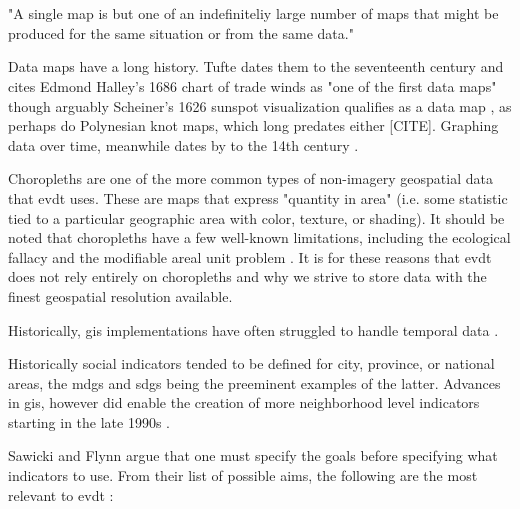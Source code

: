 \chapter{} \label{ch:method}



\section{}


"A single map is but one of an indefiniteliy large number of maps that might be produced for the same situation or from the same data." \cite{monmonierHowLieMaps1996}

Data maps have a long history. Tufte dates them to the seventeenth century and cites Edmond Halley's 1686 chart of trade winds as "one of the first data maps" \cite{tufteVisualDisplayQuantitative2001} though arguably Scheiner's 1626 sunspot visualization qualifies as a data map \cite{friendlyBriefHistoryData2008}, as perhaps do Polynesian knot maps, which long predates either [CITE]. Graphing data over time, meanwhile dates by to the 14th century \cite{friendlyBriefHistoryData2008}.

Choropleths are one of the more common types of non-imagery geospatial data that \ac{evdt} uses. These are maps that express "quantity in area" (i.e. some statistic tied to a particular geographic area with color, texture, or shading). It should be noted that choropleths have a few well-known limitations, including the ecological fallacy and the modifiable areal unit problem \cite{cramptonRethinkingMapsIdentity2011, sawickiNeighborhoodIndicatorsReview1996}. It is for these reasons that \ac{evdt} does not rely entirely on choropleths and why we strive to store data with the finest geospatial resolution available.

Historically, \ac{gis} implementations have often struggled to handle temporal data \cite{harrisLocationalModelsGeographic1993}.

Historically social indicators tended to be defined for city, province, or national areas, the \acp{mdg} and \acp{sdg} being the preeminent examples of the latter. Advances in \ac{gis}, however did enable the creation of more neighborhood level indicators starting in the late 1990s \cite{sawickiNeighborhoodIndicatorsReview1996}. 

Sawicki and Flynn argue that one must specify the goals before specifying what indicators to use. From their list of possible aims, the following are the most relevant to \ac{evdt} \cite{sawickiNeighborhoodIndicatorsReview1996}:

